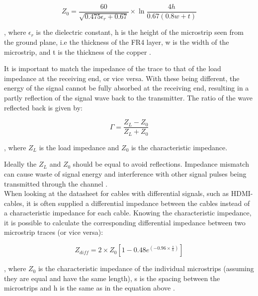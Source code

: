 \documentclass[main.tex]{subfiles}
\begin{document}
\begin{equation}
    Z_0 = \frac{60}{\sqrt{0.475\epsilon_r + 0.67}} \times \ln{\frac{4h}{0.67(0.8w + t)}}
\end{equation}

, where $\epsilon_r$ is the dielectric constant, h is the height of the microstrip seen from the ground plane, i.e the thickness of the FR4 layer, w is the width of the microstrip, and t is the thickness of the copper \cite{weste11}.

It is important to match the impedance of the trace to that of the load impedance at the receiving end, or vice versa. With these being different, the energy of the signal cannot be fully absorbed at the receiving end, resulting in a partly reflection of the signal wave back to the transmitter. The ratio of the wave reflected back is given by:

\begin{equation}
\Gamma = \frac{Z_L - Z_0}{Z_L + Z_0}	
\end{equation}

, where $Z_L$ is the load impedance and $Z_0$ is the characteristic impedance.

Ideally the $Z_L$ and $Z_0$ should be equal to avoid reflections. Impedance mismatch can cause waste of signal energy and interference with other signal pulses being transmitted through the channel \cite{weste11}. \\

When looking at the datasheet for cables with differential signals, such as HDMI-cables, it is often supplied a differential impedance between the cables instead of a characteristic impedance for each cable. Knowing the characteristic impedance, it is possible to calculate the corresponding differential impedance between two microstrip traces (or vice versa):

\begin{equation}
    Z_{diff} = 2 \times Z_0 [1 - 0.48 e^{(-0.96 \times \frac{s}{h})}]
\end{equation}

, where $Z_0$ is the characteristic impedance of the individual microstrips (assuming they are equal and have the same length), s is the spacing between the microstrips and h is the same as in the equation above \cite{douglas98}.
\end{document}
